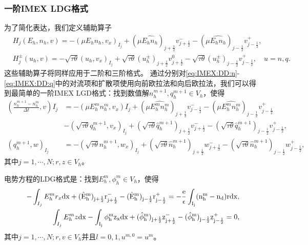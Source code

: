 \subsubsection{一阶IMEX LDG格式}
为了简化表达，我们定义辅助算子
\begin{align}
	 & H_j(E_h,n_h,v)    = - (\mu E_h n_h, v_x)_{I_j} + (\mu \widehat{E_h n_h})_{j+\frac{1}{2}}v_{j+\frac{1}{2}}^- - (\mu \widehat{E_h n_h})_{j-\frac{1}{2}}v_{j-\frac{1}{2}}^+, \label{eq:IMEX:DD:notation:1}                                \\
	 & H_j^{\pm}(u_h,v)  =- \sqrt{\tau \theta}(u_h,v_x)_{I_j} + \sqrt{\tau\theta}(u_h^{\pm})_{j+\frac{1}{2}}v_{j+\frac{1}{2}}^0 - \sqrt{\tau\theta}(u_h^{\pm})_{j-\frac{1}{2}}v_{j-\frac{1}{2}}^+,\quad u = n,q.\label{eq:IMEX:DD:notation:2}
\end{align}
这些辅助算子将同样应用于二阶和三阶格式。
通过分别对\eqref{eq:IMEX:DD:n}-\eqref{eq:IMEX:DD:q}中的对流项和扩散项使用向前欧拉法和向后欧拉法，我们可以得到最简单的一阶IMEX LGD格式：找到数值解$n_h^{m+1},q_h^{m+1}\in V_h$，使得
\begin{align}
	(\frac{n_h^{m+1} - n_h^m}{\Delta t},v)I_j & = -(\mu E_h^mn_h^m, v_x)I_j + (\mu \hat{E_h^mn_h^m})_{j+\frac{1}{2}}v_{j-\frac{1}{2}}^- - (\mu\hat{E_h^mn_h^m})_{j-\frac{1}{2}}v^+_{j-\frac{1}{2}}                                         \nonumber                 \\
	                                          & -(\sqrt{\tau \theta}q_h^{m+1},v_x)_{I_j} + (\sqrt{\tau \theta}\hat{q}_h^{m+1})_{j+\frac{1}{2}}v_{j+\frac{1}{2}}^- - (\sqrt{\tau \theta}\hat{q}_h^{m+1})_{j-\frac{1}{2}}v_{j-\frac{1}{2}}^+,  \label{eq:IMEX:1:first} \\
	(q_h^{m+1},w)_{I_j}                       & = -(\sqrt{\tau \theta}n_h^{m+1},w_x)_{I_j} + (\sqrt{\tau \theta}\hat{n}_h^{m+1})_{j+\frac{1}{2}}w_{j+\frac{1}{2}}^- - (\sqrt{\tau \theta}\hat{n}_h^{m+1})_{j-\frac{1}{2}}w_{j-\frac{1}{2}}^+,
\end{align}
其中$j = 1,\cdots,N; r,z \in V_h$。

电势方程的LDG格式是：找到$E_h^{m},\phi_h^{m} \in V_h$，使得
\begin{align}
	-\int_{I_j} E_h^{m}r_x \rm{d}x + (\hat{E}_h^{m})_{j+\frac{1}{2}}r_{j+\frac{1}{2}}^- - (\hat{E}_h^{m})_{j-\frac{1}{2}}r_{j-\frac{1}{2}}^+ = -\frac{e}{\epsilon}\int_{I_j}(n_h^{m} - n_d) r\rm{d} x, \\
	\int_{I_j} E_h^{m}z \rm{d}x - \int_{I_j} \phi_h^{m}z_x \rm{d}x  + (\hat{\phi}_h^{m})_{j+\frac{1}{2}}z^-_{j+\frac{1}{2}} - (\hat{\phi}_h^{m})_{j-\frac{1}{2}}z_{j-\frac{1}{2}}^+  = 0,\label{eq:IMEX:1:last}
\end{align}
其中$j = 1,\cdots,N; r,v \in V_h$并且$l = 0,1, u^{m,0} = u^m$。
